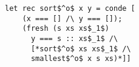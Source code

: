 \begin{figure}[h]
  \centering
  \begin{minipage}{0.87\columnwidth}
    \begin{lstlisting}[frame=tb]
 let rec sort$^o$ x y = conde [
    (x === [] /\ y === []);
    (fresh (s xs xs$_1$)
      y === s :: xs$_1$ /\
      [*sort$^o$ xs xs$_1$ /\
      smallest$^o$ x s xs)*]]
    \end{lstlisting}
  \end{minipage}
\end{figure}
